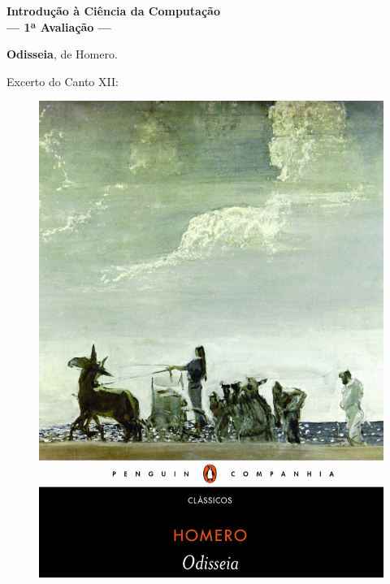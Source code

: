 \begin{coverpages}

\begin{center}
\textbf{\Large%
Introdução à Ciência da Computação\\
--- 1ª Avaliação ---}
\end{center}

\vspace{0.6cm}

\begin{center}
\textbf{Odisseia}, de Homero.

\vspace{0.5cm}
Excerto do Canto XII:
\end{center}
\vspace{0.3cm}
\small{%
\begin{figure}
\vspace{-1cm}
\begin{center}
\includegraphics[scale=0.53]{imagens/cover/odisseia2.jpg}\\

\end{center}
\end{figure}}
\end{coverpages}
